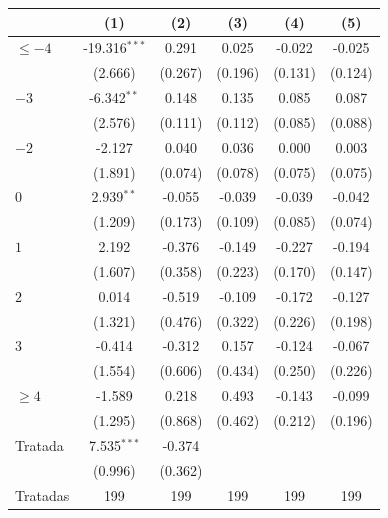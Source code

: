 
\begingroup
\centering
\begin{tabular}{lccccc}
   \toprule
                        & (1)             & (2)     & (3)     & (4)     & (5)\\  
   \midrule 
   $\leq -4$            & -19.316$^{***}$ & 0.291   & 0.025   & -0.022  & -0.025\\   
                        & (2.666)         & (0.267) & (0.196) & (0.131) & (0.124)\\   
   $-3$                 & -6.342$^{**}$   & 0.148   & 0.135   & 0.085   & 0.087\\   
                        & (2.576)         & (0.111) & (0.112) & (0.085) & (0.088)\\   
   $-2$                 & -2.127          & 0.040   & 0.036   & 0.000   & 0.003\\   
                        & (1.891)         & (0.074) & (0.078) & (0.075) & (0.075)\\   
   $0$                  & 2.939$^{**}$    & -0.055  & -0.039  & -0.039  & -0.042\\   
                        & (1.209)         & (0.173) & (0.109) & (0.085) & (0.074)\\   
   $1$                  & 2.192           & -0.376  & -0.149  & -0.227  & -0.194\\   
                        & (1.607)         & (0.358) & (0.223) & (0.170) & (0.147)\\   
   $2$                  & 0.014           & -0.519  & -0.109  & -0.172  & -0.127\\   
                        & (1.321)         & (0.476) & (0.322) & (0.226) & (0.198)\\   
   $3$                  & -0.414          & -0.312  & 0.157   & -0.124  & -0.067\\   
                        & (1.554)         & (0.606) & (0.434) & (0.250) & (0.226)\\   
   $\geq 4$             & -1.589          & 0.218   & 0.493   & -0.143  & -0.099\\   
                        & (1.295)         & (0.868) & (0.462) & (0.212) & (0.196)\\   
   Tratada              & 7.535$^{***}$   & -0.374  &         &         &   \\   
                        & (0.996)         & (0.362) &         &         &   \\   
   Tratadas             & 199             & 199     & 199     & 199     & 199\\  

\end{tabular}
